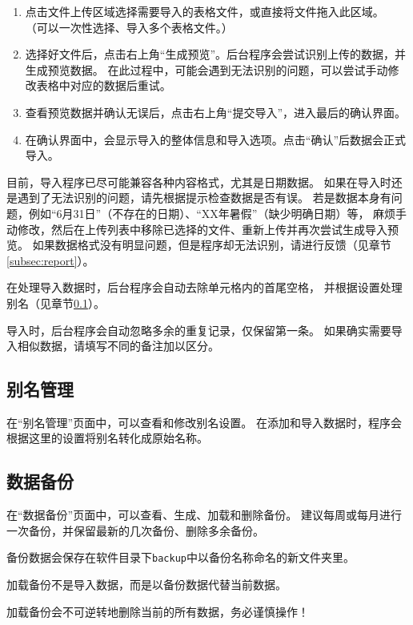 \documentclass[12pt,titlepage]{article}
\begin{document}
\begin{enumerate}
    \item 点击文件上传区域选择需要导入的表格文件，或直接将文件拖入此区域。
          （可以一次性选择、导入多个表格文件。）
    \item 选择好文件后，点击右上角“生成预览”。后台程序会尝试识别上传的数据，并生成预览数据。
          在此过程中，可能会遇到无法识别的问题，可以尝试手动修改表格中对应的数据后重试。
    \item 查看预览数据并确认无误后，点击右上角“提交导入”，进入最后的确认界面。
    \item 在确认界面中，会显示导入的整体信息和导入选项。点击“确认”后数据会正式导入。
\end{enumerate}

目前，导入程序已尽可能兼容各种内容格式，尤其是日期数据。
如果在导入时还是遇到了无法识别的问题，请先根据提示检查数据是否有误。
若是数据本身有问题，例如“6月31日”（不存在的日期）、“XX年暑假”（缺少明确日期）等，
麻烦手动修改，然后在上传列表中移除已选择的文件、重新上传并再次尝试生成导入预览。
如果数据格式没有明显问题，但是程序却无法识别，请进行反馈（见章节\ref{subsec:report}）。

\begin{warnings}
    \item 在处理导入数据时，后台程序会自动去除单元格内的首尾空格，
    并根据设置处理别名（见章节\ref{subsec:alias}）。
    \item 导入时，后台程序会自动忽略多余的重复记录，仅保留第一条。
    如果确实需要导入相似数据，请填写不同的备注加以区分。
\end{warnings}

\subsection{别名管理}
\label{subsec:alias}

在“别名管理”页面中，可以查看和修改别名设置。
在添加和导入数据时，程序会根据这里的设置将别名转化成原始名称。

\subsection{数据备份}
\label{subsec:backup}

在“数据备份”页面中，可以查看、生成、加载和删除备份。
建议每周或每月进行一次备份，并保留最新的几次备份、删除多余备份。

备份数据会保存在软件目录下\texttt{backup}中以备份名称命名的新文件夹里。

\begin{warnings}
    \item 加载备份不是导入数据，而是以备份数据代替当前数据。
    \item 加载备份会不可逆转地删除当前的所有数据，务必谨慎操作！
\end{warnings}
\end{document}
